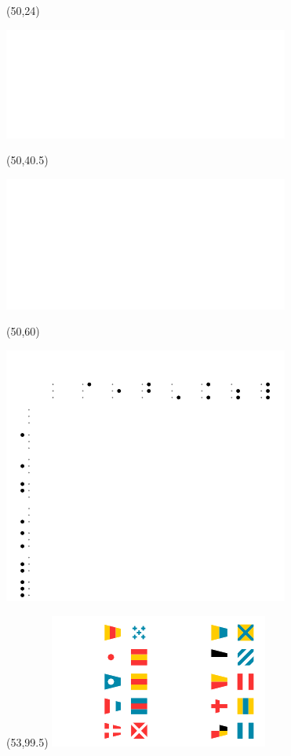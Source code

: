 \documentclass{extarticle}
\begin{document}
\begin{textblock}{38}(50,24)
\vfill
{\centerline{\includegraphics[scale=0.7]{tools/rosicrucian-polish-v2.pdf}}} 
\vfill
\end{textblock}

\begin{textblock}{38}(50,40.5)
\vfill
{\centerline{\includegraphics[scale=0.7]{tools/keyboard.pdf}}} 
\vfill
\end{textblock}

\begin{textblock}{38}(50,60)
\vfill
{\centerline{\includegraphics[scale=0.7]{tools/braille-lookup.pdf}}} 
\vfill
\end{textblock}

\begin{textblock}{0}(53,99.5)%
\vfill
{\includegraphics[scale=0.7]{tools/numbers.pdf}}
\vfill
\end{textblock}
\end{document}

